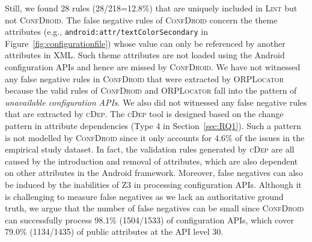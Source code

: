 Still, we found 28 rules (28/218=12.8\%) that are uniquely included in \textsc{Lint} but not \textsc{ConfDroid}.
The false negative rules of \textsc{ConfDroid} concern the theme attributes (e.g., \texttt{android:attr/textColorSecondary} in Figure~\ref{fig:configurationfile}) whose value can only be referenced by another attributes in XML.
Such theme attributes are not loaded using the Android configuration APIs and
hence are missed by \textsc{ConfDroid}.
We have not witnessed any false negative rules in \textsc{ConfDroid} that were
extracted by \textsc{ORPLocator} because the valid rules of 
\textsc{ConfDroid} and \textsc{ORPLocator} fall into the pattern of \textit{unavailable
configuration APIs}.
We also did not witnessed any false negative rules that are extracted by
\textsc{cDep}. 
The \textsc{cDep} tool is designed based on the change pattern in attribute dependencies (Type 4 in Section~\ref{sec:RQ1}).
Such a pattern is not modelled by \textsc{ConfDroid} since it only accounts for 4.6\% of the issues in the empirical study dataset.
In fact, the validation rules generated by \textsc{cDep} are all caused by the introduction and removal of attributes, which are also dependent on other attributes in the Android framework.
Moreover, false negatives can also be induced by the inabilities of Z3 in
processing configuration APIs.
Although it is challenging to measure false negatives as we lack an authoritative
ground truth, we argue that the number of false negatives can be small since \textsc{ConfDroid} can
successfully process 98.1\% (1504/1533) of configuration APIs, which cover
79.0\% (1134/1435) of public attributes at the API level 30.

